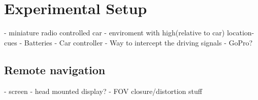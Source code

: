 \chapter{Experimental Setup}
- miniature radio controlled car
- enviroment with high(relative to car) location-cues
- Batteries
- Car controller
- Way to intercept the driving signals
- GoPro?

\section{Remote navigation}
- screen
- head mounted display?
- FOV closure/distortion stuff